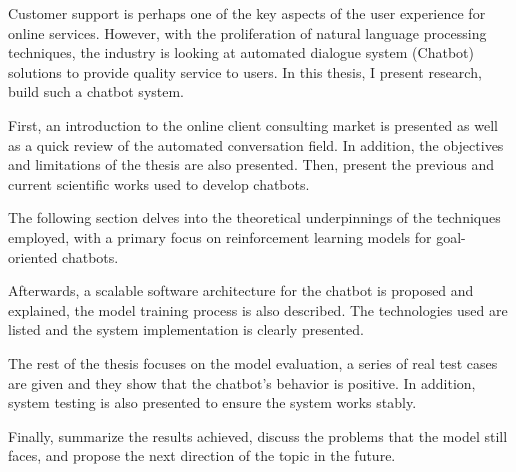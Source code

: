 \begin{abstractTA}

Customer support is perhaps one of the key aspects of the user
experience for online services. However, with the proliferation
of natural language processing techniques, the industry is
looking at automated dialogue system (Chatbot) solutions to provide
quality service to users. In this thesis, I present research, build
such a chatbot system.

First, an introduction to the online client consulting market is
presented as well as a quick review of the automated conversation
field. In addition, the objectives and limitations of the thesis
are also presented. Then, present the previous and
current scientific works used to develop chatbots.

The following section delves into the theoretical underpinnings of
the techniques employed, with a primary focus on reinforcement
learning models for goal-oriented chatbots.

Afterwards, a scalable software architecture for the chatbot is
proposed and explained, the model training process is also described.
The technologies used are listed and the system implementation is
clearly presented.

The rest of the thesis focuses on the model evaluation, a series of
real test cases are given and they show that the chatbot's behavior
is positive. In addition, system testing is also presented to
ensure the system works stably.

Finally, summarize the results achieved, discuss the problems that
the model still faces, and propose the next direction of the topic
in the future.

\end{abstractTA}

